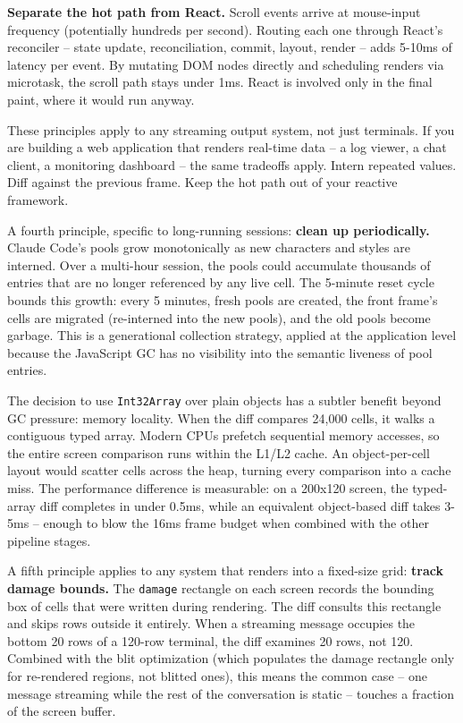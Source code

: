 \documentclass[
  english,
  11pt,
  letterpaper,
]{book}
\begin{document}
\textbf{Separate the hot path from React.} Scroll events arrive at
mouse-input frequency (potentially hundreds per second). Routing each
one through React's reconciler -- state update, reconciliation, commit,
layout, render -- adds 5-10ms of latency per event. By mutating DOM
nodes directly and scheduling renders via microtask, the scroll path
stays under 1ms. React is involved only in the final paint, where it
would run anyway.

These principles apply to any streaming output system, not just
terminals. If you are building a web application that renders real-time
data -- a log viewer, a chat client, a monitoring dashboard -- the same
tradeoffs apply. Intern repeated values. Diff against the previous
frame. Keep the hot path out of your reactive framework.

A fourth principle, specific to long-running sessions: \textbf{clean up
periodically.} Claude Code's pools grow monotonically as new characters
and styles are interned. Over a multi-hour session, the pools could
accumulate thousands of entries that are no longer referenced by any
live cell. The 5-minute reset cycle bounds this growth: every 5 minutes,
fresh pools are created, the front frame's cells are migrated
(re-interned into the new pools), and the old pools become garbage. This
is a generational collection strategy, applied at the application level
because the JavaScript GC has no visibility into the semantic liveness
of pool entries.

The decision to use \texttt{Int32Array} over plain objects has a subtler
benefit beyond GC pressure: memory locality. When the diff compares
24,000 cells, it walks a contiguous typed array. Modern CPUs prefetch
sequential memory accesses, so the entire screen comparison runs within
the L1/L2 cache. An object-per-cell layout would scatter cells across
the heap, turning every comparison into a cache miss. The performance
difference is measurable: on a 200x120 screen, the typed-array diff
completes in under 0.5ms, while an equivalent object-based diff takes
3-5ms -- enough to blow the 16ms frame budget when combined with the
other pipeline stages.

A fifth principle applies to any system that renders into a fixed-size
grid: \textbf{track damage bounds.} The \texttt{damage} rectangle on
each screen records the bounding box of cells that were written during
rendering. The diff consults this rectangle and skips rows outside it
entirely. When a streaming message occupies the bottom 20 rows of a
120-row terminal, the diff examines 20 rows, not 120. Combined with the
blit optimization (which populates the damage rectangle only for
re-rendered regions, not blitted ones), this means the common case --
one message streaming while the rest of the conversation is static --
touches a fraction of the screen buffer.
\end{document}
